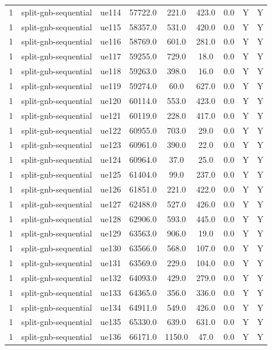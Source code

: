 \begin{table}[ht]
\begin{tabular}{|c|c|c|c|c|c|c|c|c|}
1 & split-gnb-sequential & ue114 & 57722.0 & 221.0 & 423.0 & 0.0 & Y & Y \\
1 & split-gnb-sequential & ue115 & 58357.0 & 531.0 & 420.0 & 0.0 & Y & Y \\
1 & split-gnb-sequential & ue116 & 58769.0 & 601.0 & 281.0 & 0.0 & Y & Y \\
1 & split-gnb-sequential & ue117 & 59255.0 & 729.0 & 18.0 & 0.0 & Y & Y \\
1 & split-gnb-sequential & ue118 & 59263.0 & 398.0 & 16.0 & 0.0 & Y & Y \\
1 & split-gnb-sequential & ue119 & 59274.0 & 60.0 & 627.0 & 0.0 & Y & Y \\
1 & split-gnb-sequential & ue120 & 60114.0 & 553.0 & 423.0 & 0.0 & Y & Y \\
1 & split-gnb-sequential & ue121 & 60119.0 & 228.0 & 417.0 & 0.0 & Y & Y \\
1 & split-gnb-sequential & ue122 & 60955.0 & 703.0 & 29.0 & 0.0 & Y & Y \\
1 & split-gnb-sequential & ue123 & 60961.0 & 390.0 & 22.0 & 0.0 & Y & Y \\
1 & split-gnb-sequential & ue124 & 60964.0 & 37.0 & 25.0 & 0.0 & Y & Y \\
1 & split-gnb-sequential & ue125 & 61404.0 & 99.0 & 237.0 & 0.0 & Y & Y \\
1 & split-gnb-sequential & ue126 & 61851.0 & 221.0 & 422.0 & 0.0 & Y & Y \\
1 & split-gnb-sequential & ue127 & 62488.0 & 527.0 & 426.0 & 0.0 & Y & Y \\
1 & split-gnb-sequential & ue128 & 62906.0 & 593.0 & 445.0 & 0.0 & Y & Y \\
1 & split-gnb-sequential & ue129 & 63563.0 & 906.0 & 19.0 & 0.0 & Y & Y \\
1 & split-gnb-sequential & ue130 & 63566.0 & 568.0 & 107.0 & 0.0 & Y & Y \\
1 & split-gnb-sequential & ue131 & 63569.0 & 229.0 & 104.0 & 0.0 & Y & Y \\
1 & split-gnb-sequential & ue132 & 64093.0 & 429.0 & 279.0 & 0.0 & Y & Y \\
1 & split-gnb-sequential & ue133 & 64365.0 & 356.0 & 336.0 & 0.0 & Y & Y \\
1 & split-gnb-sequential & ue134 & 64911.0 & 549.0 & 426.0 & 0.0 & Y & Y \\
1 & split-gnb-sequential & ue135 & 65330.0 & 639.0 & 631.0 & 0.0 & Y & Y \\
1 & split-gnb-sequential & ue136 & 66171.0 & 1150.0 & 47.0 & 0.0 & Y & Y \\

\end{tabular}
\end{table}
